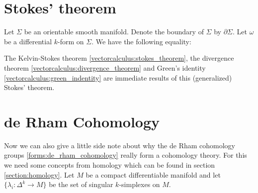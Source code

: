 \section{Stokes' theorem}	
	\begin{theorem}
		Let $\Sigma$ be an orientable smooth manifold. Denote the boundary of $\Sigma$ by $\partial\Sigma$. Let $\omega$ be a differential $k$-form on $\Sigma$. We have the following equality:
	\end{theorem}
	\begin{result}
		The Kelvin-Stokes theorem \ref{vectorcalculus:stokes_theorem}, the divergence theorem \ref{vectorcalculus:divergence_theorem} and Green's identity \ref{vectorcalculus:green_indentity} are immediate results of this (generalized) Stokes' theorem.
	\end{result}

\section{de Rham Cohomology}

	Now we can also give a little side note about why the de Rham cohomology groups \ref{forms:de_rham_cohomology} really form a cohomology theory. For this we need some concepts from homology which can be found in section \ref{section:homology}. Let $M$ be a compact differentiable manifold and let $\{\lambda_i:\Delta^k\rightarrow M\}$ be the set of singular $k$-simplexes on $M$.
	
